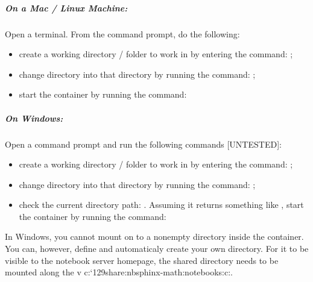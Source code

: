 \documentclass[letterpaper,10pt,english]{sphinxmanual}
\begin{document}
\subparagraph{On a Mac / Linux Machine:}
\label{\detokenize{content/00_READ_ME_FIRST/Section_00_05_Accessing_RoboLab:On-a-Mac-/-Linux-Machine:}}
Open a terminal. From the command prompt, do the following:
\begin{itemize}
\item {} 
create a working directory / folder to work in by entering the command: ;

\item {} 
change directory into that directory by running the command: ;

\item {} 
start the container by running the command: 

\end{itemize}


\subparagraph{On Windows:}
\label{\detokenize{content/00_READ_ME_FIRST/Section_00_05_Accessing_RoboLab:On-Windows:}}
Open a command prompt and run the following commands {[}UNTESTED{]}:
\begin{itemize}
\item {} 
create a working directory / folder to work in by entering the command: ;

\item {} 
change directory into that directory by running the command: ;

\item {} 
check the current directory path: . Assuming it returns something like , start the container by running the command: 

\end{itemize}

 In Windows, you cannot mount on to a non\sphinxhyphen{}empty directory inside the container. You can, however, define and automaticaly create your own directory. For it to be visible to the notebook server homepage, the shared directory needs to be mounted along the \sphinxhyphen{}v
c:\tm`129share:nbsphinx-math:notebooks\textasciigrave{}:c:\home\jovyan\mySharedDirectory\textasciigrave{}.
\end{document}
